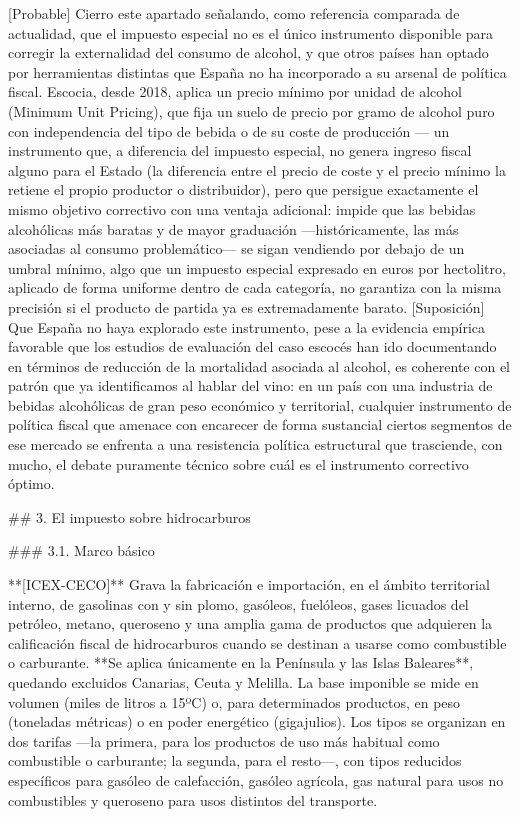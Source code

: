 \documentclass[10pt,a4paper]{article}
\begin{document}
[Probable] Cierro este apartado señalando, como referencia comparada de actualidad, que el impuesto especial no es el único instrumento disponible para corregir la externalidad del consumo de alcohol, y que otros países han optado por herramientas distintas que España no ha incorporado a su arsenal de política fiscal. Escocia, desde 2018, aplica un precio mínimo por unidad de alcohol (Minimum Unit Pricing), que fija un suelo de precio por gramo de alcohol puro con independencia del tipo de bebida o de su coste de producción — un instrumento que, a diferencia del impuesto especial, no genera ingreso fiscal alguno para el Estado (la diferencia entre el precio de coste y el precio mínimo la retiene el propio productor o distribuidor), pero que persigue exactamente el mismo objetivo correctivo con una ventaja adicional: impide que las bebidas alcohólicas más baratas y de mayor graduación —históricamente, las más asociadas al consumo problemático— se sigan vendiendo por debajo de un umbral mínimo, algo que un impuesto especial expresado en euros por hectolitro, aplicado de forma uniforme dentro de cada categoría, no garantiza con la misma precisión si el producto de partida ya es extremadamente barato. [Suposición] Que España no haya explorado este instrumento, pese a la evidencia empírica favorable que los estudios de evaluación del caso escocés han ido documentando en términos de reducción de la mortalidad asociada al alcohol, es coherente con el patrón que ya identificamos al hablar del vino: en un país con una industria de bebidas alcohólicas de gran peso económico y territorial, cualquier instrumento de política fiscal que amenace con encarecer de forma sustancial ciertos segmentos de ese mercado se enfrenta a una resistencia política estructural que trasciende, con mucho, el debate puramente técnico sobre cuál es el instrumento correctivo óptimo.


## 3. El impuesto sobre hidrocarburos

### 3.1. Marco básico

**[ICEX-CECO]** Grava la fabricación e importación, en el ámbito territorial interno, de gasolinas con y sin plomo, gasóleos, fuelóleos, gases licuados del petróleo, metano, queroseno y una amplia gama de productos que adquieren la calificación fiscal de hidrocarburos cuando se destinan a usarse como combustible o carburante. **Se aplica únicamente en la Península y las Islas Baleares**, quedando excluidos Canarias, Ceuta y Melilla. La base imponible se mide en volumen (miles de litros a 15ºC) o, para determinados productos, en peso (toneladas métricas) o en poder energético (gigajulios). Los tipos se organizan en dos tarifas —la primera, para los productos de uso más habitual como combustible o carburante; la segunda, para el resto—, con tipos reducidos específicos para gasóleo de calefacción, gasóleo agrícola, gas natural para usos no combustibles y queroseno para usos distintos del transporte.
\end{document}
